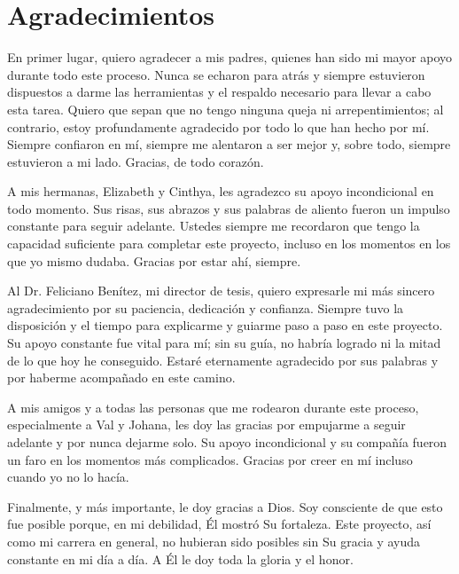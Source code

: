 \chapter*{Agradecimientos}

En primer lugar, quiero agradecer a mis padres, quienes han sido mi mayor apoyo durante todo este proceso. Nunca se echaron para atrás y siempre estuvieron dispuestos a darme las herramientas y el respaldo necesario para llevar a cabo esta tarea. Quiero que sepan que no tengo ninguna queja ni arrepentimientos; al contrario, estoy profundamente agradecido por todo lo que han hecho por mí. Siempre confiaron en mí, siempre me alentaron a ser mejor y, sobre todo, siempre estuvieron a mi lado. Gracias, de todo corazón.

A mis hermanas, Elizabeth y Cinthya, les agradezco su apoyo incondicional en todo momento. Sus risas, sus abrazos y sus palabras de aliento fueron un impulso constante para seguir adelante. Ustedes siempre me recordaron que tengo la capacidad suficiente para completar este proyecto, incluso en los momentos en los que yo mismo dudaba. Gracias por estar ahí, siempre.

Al Dr. Feliciano Benítez, mi director de tesis, quiero expresarle mi más sincero agradecimiento por su paciencia, dedicación y confianza. Siempre tuvo la disposición y el tiempo para explicarme y guiarme paso a paso en este proyecto. Su apoyo constante fue vital para mí; sin su guía, no habría logrado ni la mitad de lo que hoy he conseguido. Estaré eternamente agradecido por sus palabras y por haberme acompañado en este camino.

A mis amigos y a todas las personas que me rodearon durante este proceso, especialmente a Val y Johana, les doy las gracias por empujarme a seguir adelante y por nunca dejarme solo. Su apoyo incondicional y su compañía fueron un faro en los momentos más complicados. Gracias por creer en mí incluso cuando yo no lo hacía.

Finalmente, y más importante, le doy gracias a Dios. Soy consciente de que esto fue posible porque, en mi debilidad, Él mostró Su fortaleza. Este proyecto, así como mi carrera en general, no hubieran sido posibles sin Su gracia y ayuda constante en mi día a día. A Él le doy toda la gloria y el honor.
